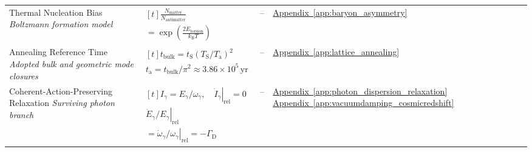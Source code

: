 \begin{longtable}{@{} p{4.5cm} p{6cm} c p{4cm} @{}}
{\raggedright Thermal Nucleation Bias \newline \textit{Boltzmann formation model}\par} & {\raggedright $\begin{gathered}[t]\frac{N_{\mathrm{matter}}}{N_{\mathrm{antimatter}}} \\ =\exp\!\left(\frac{2E_{\mathrm{torsion}}}{k_{\mathrm B}T}\right)\end{gathered}$\par} & -- & {\raggedright \hyperref[app:baryon_asymmetry]{Appendix~\ref*{app:baryon_asymmetry}}\par} \\

{\raggedright Annealing Reference Time \newline \textit{Adopted bulk and geometric mode closures}\par} & {\raggedright $\begin{gathered}[t]t_{\mathrm{bulk}}=t_{\mathrm S}(T_{\mathrm S}/T_{\mathrm a})^2 \\ t_{\mathrm a}=t_{\mathrm{bulk}}/\pi^2\approx3.86\times10^5\,\mathrm{yr}\end{gathered}$\par} & -- & {\raggedright \hyperref[app:lattice_annealing]{Appendix~\ref*{app:lattice_annealing}}\par} \\

{\raggedright Coherent-Action-Preserving Relaxation \newline \textit{Surviving photon branch}\par} & {\raggedright $\begin{gathered}[t]I_\gamma=E_\gamma/\omega_\gamma,\quad \left.\dot I_\gamma\right|_{\mathrm{rel}}=0 \\ \left.\dot E_\gamma/E_\gamma\right|_{\mathrm{rel}} \\ =\left.\dot\omega_\gamma/\omega_\gamma\right|_{\mathrm{rel}}=-\Gamma_{\mathrm D}\end{gathered}$\par} & -- & {\raggedright \hyperref[app:photon_dispersion_relaxation]{Appendix~\ref*{app:photon_dispersion_relaxation}} \newline \hyperref[app:vacuumdamping_cosmicredshift]{Appendix~\ref*{app:vacuumdamping_cosmicredshift}}\par} \\


\end{longtable}
